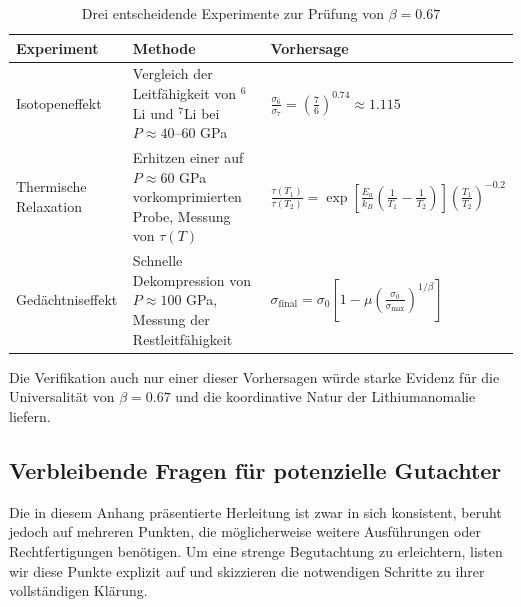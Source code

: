 \documentclass[12pt,a4paper]{article}
\theoremstyle{remark}
\begin{document}
	\begin{table}[h]
		\centering
		\caption{Drei entscheidende Experimente zur Prüfung von \(\beta = 0.67\)}
		\label{tab:experiments}
		\begin{tabular}{p{}p{}p{}}
			\toprule
			\textbf{Experiment} & \textbf{Methode} & \textbf{Vorhersage} \\
			\midrule
			Isotopeneffekt & Vergleich der Leitfähigkeit von \(^6\)Li und \(^7\)Li bei \(P \approx 40\)–60 GPa & \(\displaystyle \frac{\sigma_6}{\sigma_7} = \left(\frac{7}{6}\right)^{0.74} \approx 1.115\) \\
			\hline
			Thermische Relaxation & Erhitzen einer auf \(P \approx 60\) GPa vorkomprimierten Probe, Messung von \(\tau(T)\) & \(\displaystyle \frac{\tau(T_1)}{\tau(T_2)} = \exp\left[\frac{E_a}{k_B}\left(\frac1{T_1}-\frac1{T_2}\right)\right] \left(\frac{T_1}{T_2}\right)^{-0.2}\) \\
			\hline
			Gedächtniseffekt & Schnelle Dekompression von \(P \approx 100\) GPa, Messung der Restleitfähigkeit & \(\displaystyle \sigma_{\text{final}} = \sigma_0\left[1 - \mu\left(\frac{\sigma_0}{\sigma_{\max}}\right)^{1/\beta}\right]\) \\
			\bottomrule
		\end{tabular}
	\end{table}
	
	Die Verifikation auch nur einer dieser Vorhersagen würde starke Evidenz für die Universalität von \(\beta = 0.67\) und die koordinative Natur der Lithiumanomalie liefern.
	
	\subsection{Verbleibende Fragen für potenzielle Gutachter}
	\label{subsec:remaining-questions}
	
	Die in diesem Anhang präsentierte Herleitung ist zwar in sich konsistent, beruht jedoch auf mehreren Punkten, die möglicherweise weitere Ausführungen oder Rechtfertigungen benötigen. Um eine strenge Begutachtung zu erleichtern, listen wir diese Punkte explizit auf und skizzieren die notwendigen Schritte zu ihrer vollständigen Klärung.
	
\end{document}
